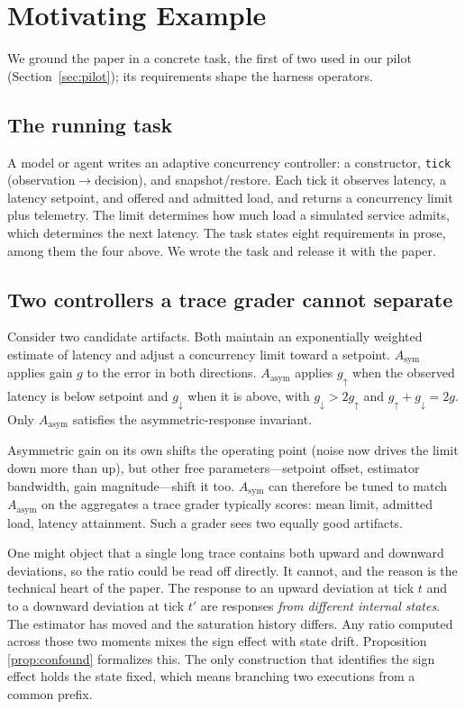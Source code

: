 \documentclass[sigconf,review,anonymous]{acmart}
\begin{document}
	\section{Motivating Example}
	\label{sec:motivating}
	
	We ground the paper in a concrete task, the first of two used in our
	pilot (Section~\ref{sec:pilot}); its requirements shape the harness
	operators.
	
	\subsection{The running task}
	
	A model or agent writes an adaptive concurrency controller: a constructor,
	\texttt{tick} (observation$\to$decision), and snapshot/restore. Each tick
	it observes latency, a latency setpoint, and offered and admitted load,
	and returns a concurrency limit plus telemetry. The limit determines how
	much load a simulated service admits, which determines the next latency.
	The task states eight requirements in prose, among them the four above.
	We wrote the task and release it with the paper.
	
	\subsection{Two controllers a trace grader cannot separate}
	\label{sec:twoorch}
	
	Consider two candidate artifacts. Both maintain an exponentially weighted
	estimate of latency and adjust a concurrency limit toward a
	setpoint. $A_{\mathrm{sym}}$ applies gain $g$ to the error in both
	directions. $A_{\mathrm{asym}}$ applies $g_{\uparrow}$ when the observed
	latency is below setpoint and $g_{\downarrow}$ when it is above, with
	$g_{\downarrow} > 2 g_{\uparrow}$ and $g_{\uparrow} + g_{\downarrow} = 2g$.
	Only $A_{\mathrm{asym}}$ satisfies the asymmetric-response invariant.
	
	Asymmetric gain on its own shifts the operating point (noise now drives
	the limit down more than up), but other free parameters---setpoint
	offset, estimator bandwidth, gain magnitude---shift it too. $A_{\mathrm{sym}}$
	can therefore be tuned to match $A_{\mathrm{asym}}$ on the aggregates a
	trace grader typically scores: mean limit, admitted load, latency attainment. Such a
	grader sees two equally good artifacts.
	
	One might object that a single long trace contains both upward and downward
	deviations, so the ratio could be read off directly. It cannot, and the
	reason is the technical heart of the paper. The response to an upward
	deviation at tick $t$ and to a downward deviation at tick $t'$ are responses
	\emph{from different internal states}. The estimator has moved and the
	saturation history differs. Any ratio
	computed across those two moments mixes the sign effect with state drift.
	Proposition \ref{prop:confound} formalizes this. The only construction that
	identifies the sign effect holds the state fixed, which means branching two
	executions from a common prefix.
	
\end{document}

